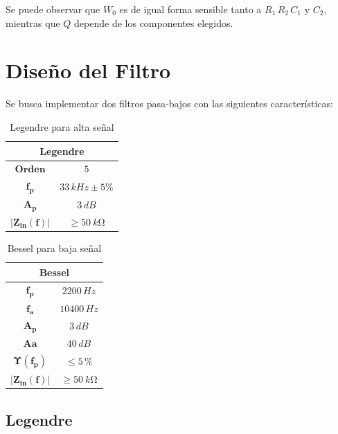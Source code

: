 	Se puede observar que $W_0$ es de igual forma sensible tanto a $R_1 \, R_2 \, C_1$ y $C_2$, mientras que $Q$ depende de los componentes elegidos.
	
\section{Diseño del Filtro}

	Se busca implementar dos filtros pasa-bajos con las siguientes características:
\begin{table}[H]
\centering
\begin{tabular}{|c|c|}
\hline
\multicolumn{2}{|c|}{\textbf{Legendre}} \\ \hline
$\mathbf{Orden}$        & $5$             \\ \hline
$\mathbf{f_p}$          & $33 \, kHz \pm 5 \% $          \\ \hline
$\mathbf{A_p}$          & $3 \, dB$          \\ \hline
$\mathbf{|Z_{in}(f)|}$  & $ \geq \SI{50}{k\ohm}$          \\ \hline
\end{tabular}
\caption{Legendre para alta señal}
\label{tabla:legendre}
\end{table}

\begin{table}[H]
\centering
\begin{tabular}{|c|c|}
\hline
\multicolumn{2}{|c|}{\textbf{Bessel}} \\ \hline
$\mathbf{f_p}$           & $2200 \, Hz$             \\ \hline
$\mathbf{f_a}$           & $10400 \, Hz$          \\ \hline
$\mathbf{A_p}$           & $3 \, dB$          \\ \hline
$\mathbf{Aa}$           & $40 \, dB$          \\ \hline
$\mathbf{\Upsilon(f_p)}$           & $\leq 5 \, \% $             \\ \hline
$\mathbf{|Z_{in}(f)|}$          & $\geq \SI{50}{k\ohm}$             \\ \hline
\end{tabular}
\caption{Bessel para baja señal}
\label{tabla:bessel}
\end{table}

\subsection{Legendre}

